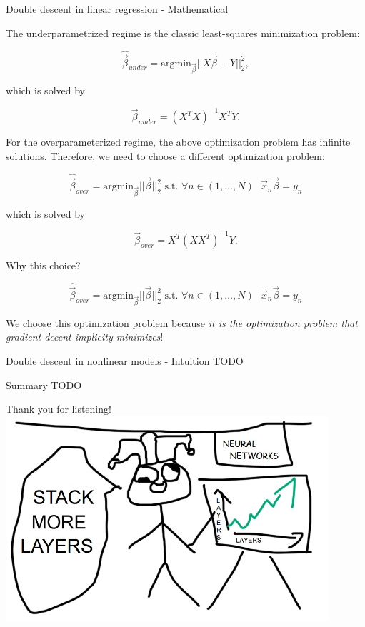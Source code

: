 \documentclass{beamer}
\begin{document}
\begin{frame}{Double descent in linear regression - Mathematical}

The underparametrized regime is the classic least-squares minimization problem:

$$\hat{\vec{\beta}}_{under} = \text{arg} \text{min}_{\vec{\beta}}||X \vec{\beta} - Y||^2_2, $$

which is solved by

$$\vec{\beta}_{under} = (X^T X)^{-1} X^T Y.$$

\pause

For the overparameterized regime, the above optimization problem has infinite solutions. Therefore, we need to choose a different optimization problem:

$$\hat{\vec{\beta}}_{over} = \text{arg} \text{min}_{\vec{\beta}}||\vec{\beta}||^2_2 \text{   s.t.   } \forall n \in (1,\dots,N) \text{   } \vec{x}_n \vec{\beta} = y_n$$

which is solved by

$$\vec{\beta}_{over} = X^T (X X^T)^{-1}Y.$$

\end{frame}


\begin{frame}{Why this choice?}

    $$\hat{\vec{\beta}}_{over} = \text{arg} \text{min}_{\vec{\beta}}||\vec{\beta}||^2_2 \text{   s.t.   } \forall n \in (1,\dots,N) \text{   } \vec{x}_n \vec{\beta} = y_n$$

We choose this optimization problem because \emph{it is the optimization problem that gradient decent implicity minimizes}!
    
\end{frame}


\begin{frame}{Double descent in nonlinear models - Intuition}
TODO
\end{frame}


\begin{frame}{Summary}
TODO
\end{frame}


\begin{frame}{Thank you for listening!}
    \includegraphics[width=\textwidth]{stackmorelayers.jpg}
\end{frame}
\end{document}
